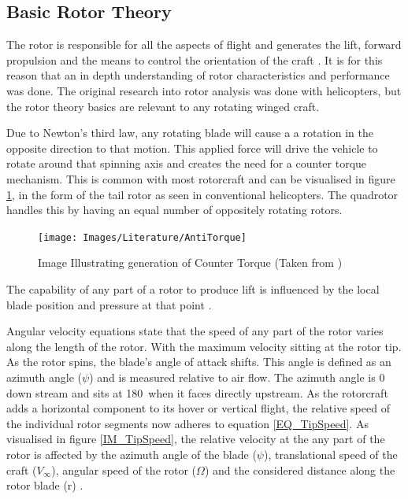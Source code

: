 	\subsection{Basic Rotor Theory}
	The rotor is responsible for all the aspects of flight and generates the lift, forward propulsion and the means to control the orientation of the craft \cite{Leishman}. It is for this reason that an in depth understanding of rotor characteristics and performance was done. The original research into rotor analysis was done with helicopters, but the rotor theory basics are relevant to any rotating winged craft.
	
	Due to Newton's third law, any rotating blade will cause a a rotation in the opposite direction to that motion. This applied force will drive the vehicle to rotate around that spinning axis and creates the need for a counter torque mechanism. This is common with most rotorcraft and can be visualised in figure \ref{IM_Antitorque}, in the form of the tail rotor as seen in conventional helicopters. The quadrotor handles this by having an equal number of oppositely rotating rotors.
	
	\begin{figure}[H]
	\centering
	\texttt{[image: Images/Literature/AntiTorque]}
	\caption{Image Illustrating generation of Counter Torque (Taken from \cite{Heli})}
	\label{IM_Antitorque}
	\end{figure}
	
	The capability of any part of a rotor to produce lift is influenced by the local blade position and pressure at that point \cite{Leishman}.

	Angular velocity equations state that the speed of any part of the rotor varies along the length of the rotor. With the maximum velocity sitting at the rotor tip. As the rotor spins, the blade's angle of attack shifts. This angle is defined as an azimuth angle ($\psi$) and is measured relative to air flow. The azimuth angle is 0\textdegree\, down stream and sits at 180\textdegree\, when it faces directly upstream. As the rotorcraft adds a horizontal component to its hover or vertical flight, the relative speed of the individual rotor segments now adheres to equation \eqref{EQ_TipSpeed}.  As visualised in figure \ref{IM_TipSpeed}, the relative velocity at the any part of the rotor is affected by the azimuth angle of the blade ($\psi$), translational speed of the craft ($V_{\infty}$), angular speed of the rotor ($\Omega$) and the considered distance along the rotor blade (r) \cite{Leishman} \cite{RotorCraftHand}. 

